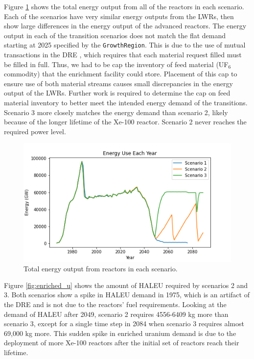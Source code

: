 Figure \ref{fig:energy} shows the total energy output from 
all of the reactors in each scenario. Each of the scenarios
have very similar energy outputs from the \gls{LWR}s, then 
show large differences in the energy output of the advanced 
reactors. The energy output in 
each of the transition scenarios does not match the flat demand 
starting at 2025 specified by the \Cycamore \texttt{GrowthRegion}. 
This is due to 
the use of mutual transactions in the \gls{DRE} 
\cite{gidden_methodology_2016}, which requires that each 
material request filled must be filled in full. Thus, we had to be 
cap the inventory of feed material (UF$_6$ commodity) that 
the enrichment facility could store. Placement of this cap to ensure 
use of both material streams causes small discrepancies in the 
energy output of the \gls{LWR}s. Further work is required 
to determine the cap on feed material inventory to better meet 
the intended energy demand of the transitions. Scenario 3 more 
closely matches the energy demand than scenario 2, likely because of the 
longer lifetime of the Xe-100 reactor. Scenario 2 never reaches 
the required power level. 

\begin{figure}[ht]
    \centering
    \includegraphics[scale=0.5]{figures/energy_all.png}
    \caption{Total energy output from reactors in each scenario.}
    \label{fig:energy}
\end{figure}

Figure \ref{fig:enriched_u} shows the amount of \gls{HALEU} 
required by scenarios 2 and 3. 
Both scenarios show a spike in \gls{HALEU} demand in 1975, which is
an artifact of the \gls{DRE} and is not due to the reactors' fuel 
requirements. Looking at the demand of \gls{HALEU} after 2049, scenario 2
requires 4556-6409 kg more than scenario 3, except for a single 
time step in 2084 when 
scenario 3 requires almost 69,000 kg more. This 
sudden spike in enriched uranium demand is due to the 
deployment of more Xe-100 reactors after the initial set 
of reactors reach their lifetime. 

